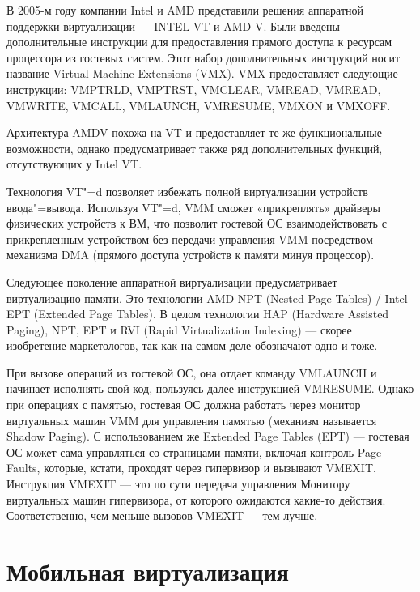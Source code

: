\documentclass[10pt, a5paper]{article}
\begin{document}
В 2005-м году компании Intel и AMD представили решения аппаратной  поддержки виртуализации --- INTEL VT и AMD-V. Были введены дополнительные инструкции для предоставления прямого доступа к ресурсам процессора из гостевых систем. Этот набор дополнительных инструкций носит название Virtual Machine Extensions (VMX). VMX предоставляет следующие инструкции: \linebreak VMPTRLD, VMPTRST, VMCLEAR, VMREAD, VMREAD, \linebreak VMWRITE, VMCALL, VMLAUNCH, VMRESUME, VMXON и \linebreak VMXOFF.

Архитектура AMDV похожа на VT и предоставляет те же функциональные возможности, однако предусматривает также ряд дополнительных функций, отсутствующих у Intel VT.

Технология VT"=d позволяет избежать полной виртуализации \linebreak устройств ввода"=вывода. Используя VT"=d, VMM сможет «прикреплять» драйверы физических устройств к ВМ, что позволит гостевой ОС взаимодействовать с прикрепленным устройством без передачи управления VMM посредством механизма DMA (прямого доступа устройств к памяти минуя процессор).

Следующее поколение аппаратной виртуализации предусматривает виртуализацию памяти. Это технологии AMD NPT (Nested Page Tables) / Intel EPT (Extended Page Tables). В целом технологии HAP (Hardware Assisted Paging), NPT, EPT и RVI (Rapid Virtualization Indexing) --- скорее изобретение маркетологов, так как на самом деле обозначают одно и тоже.

При  вызове операций из гостевой ОС, она отдает команду \linebreak VMLAUNCH и начинает исполнять свой код, пользуясь далее инструкцией VMRESUME. Однако при операциях с памятью, гостевая ОС должна работать через монитор виртуальных машин VMM для управления памятью (механизм называется Shadow Paging). С использованием же Extended Page Tables (EPT) --- гостевая ОС может сама управляться со страницами памяти, включая контроль Page Faults, которые, кстати, проходят через гипервизор и вызывают VMEXIT. Инструкция VMEXIT --- это по сути передача управления Монитору виртуальных машин гипервизора, от которого ожидаются какие-то действия. Соответственно, чем меньше вызовов VMEXIT --- тем лучше.

\section*{Мобильная виртуализация}
\end{document}
